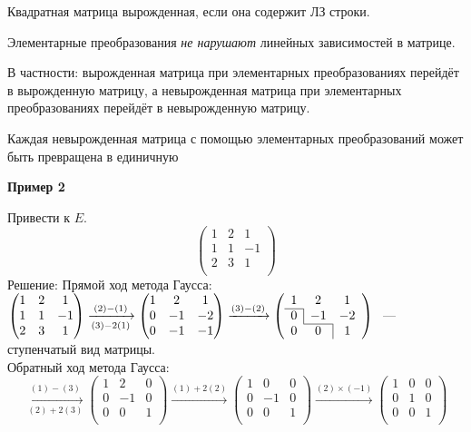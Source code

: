 Квадратная матрица вырожденная, если она содержит ЛЗ строки.

Элементарные преобразования \emph{не нарушают} линейных зависимостей в матрице.

В частности: вырожденная матрица при элементарных преобразованиях перейдёт в вырожденную матрицу, а невырожденная матрица при элементарных преобразованиях перейдёт в невырожденную матрицу.

\begin{theorem}
	Каждая невырожденная матрица с помощью элементарных преобразований может быть превращена в единичную
\end{theorem}
\noindent\textbf{Пример 2}

Привести к $E$.
$$
\begin{pmatrix}
	1 & 2 & 1\\
	1 & 1 & -1\\
	2 & 3 & 1\\
\end{pmatrix}
$$
Решение:
Прямой ход метода Гаусса:\\
$
\begin{pmatrix}
1 & 2 & 1\\
1 & 1 & -1\\
2 & 3 & 1\\
\end{pmatrix}
\xrightarrow[(3)-2(1)]{(2)-(1)}
\begin{pmatrix}
1 & 2 & 1\\
0 & -1 & -2\\
0 & -1 & -1\\
\end{pmatrix}
\xrightarrow{(3)-(2)}
\left( \begin{array}{ccc}
1 & 2 & 1\\ \cline{1-1}
0 & \multicolumn{1}{|c}{-1} & -2\\\cline{2-2}
0 & 0 & \multicolumn{1}{|c}{1}\\
\end{array} \right)\
$ 
--- ступенчатый вид матрицы.\\
Обратный ход метода Гаусса:
$$
\xrightarrow[(2)+2(3)]{(1)-(3)}
\begin{pmatrix}
	1 & 2 & 0\\
	0 & -1 & 0\\
	0 & 0 & 1\\
\end{pmatrix}
\xrightarrow{(1)+2(2)}
\begin{pmatrix}
	1 & 0 & 0\\
	0 & -1 & 0\\
	0 & 0 & 1\\
\end{pmatrix}
\xrightarrow{(2)\times (-1)}
\begin{pmatrix}
	1 & 0 & 0\\
	0 & 1 & 0\\
	0 & 0 & 1\\
\end{pmatrix}
$$

